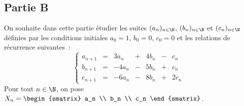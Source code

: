 \documentclass[11pt]{article}%
\begin{document}
 
 \subsection*{Partie B}

 \noindent 
 On souhaite dans cette partie étudier les suites $(a_n)_{n 
 \in \N}$, $(b_n)_{n \in \N}$ et $(c_n)_{n \in 
 \N}$ définies par les conditions initiales $a_0=1$, $b_0=0$, 
 $c_0=0$ et les relations de récurrence suivantes~:
 \[ 
  \left\{ 
  \begin{array}{rcrrrrr} 
  a_{n+1} & = & 3 a_n & + & 4 b_n & - & c_n \\ 
  b_{n+1} & = & -4 a_n & - & 5 b_n & + & c_n \\ 
  c_{n+1} & = & -6 a_n & - & 8 b_n & + & 2 c_n 
  \end{array} 
  \right. 
 \]
 Pour tout $n \in \N$, on pose $X_n = 
 \begin{smatrix} 
 a_n \\ 
 b_n \\ 
 c_n 
 \end{smatrix}$.
\end{document}
